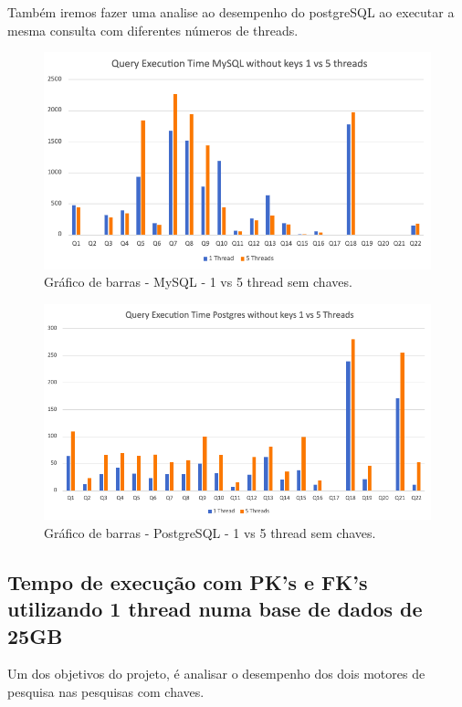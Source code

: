 \documentclass{article}
\begin{document}
  Também iremos fazer uma analise ao desempenho do postgreSQL ao executar a mesma consulta com diferentes números de threads.

  \begin{figure}[H]
    \centering
    \includegraphics[width=\textwidth]{Graphs/mysql_withoutkeys_1vs5threads.png}
    \caption{Gráfico de barras - MySQL - 1 vs 5 thread sem chaves.} 
    \label{fig:PKCreation2}

  \end{figure}



  \begin{figure}[H]
    \centering
    \includegraphics[width=\textwidth]{Graphs/postgres_withoutkeys_1vs5.png}
    \caption{Gráfico de barras - PostgreSQL - 1 vs 5 thread sem chaves.} 
    \label{fig:PKCreation2}
  \end{figure}





\clearpage
\subsection{Tempo de execução com PK's e FK's utilizando 1 thread numa base
de dados de 25GB}
Um dos objetivos do projeto, é analisar o desempenho dos dois motores de pesquisa nas pesquisas com chaves.
\end{document}
